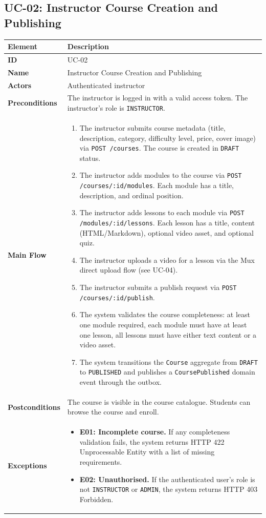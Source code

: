 \subsection{UC-02: Instructor Course Creation and Publishing}

\begin{longtable}{p{3cm}p{10cm}}
  \toprule
  \textbf{Element} & \textbf{Description} \\
  \midrule
  \endhead
  \midrule
  \endfoot
  \textbf{ID} & UC-02 \\
  \textbf{Name} & Instructor Course Creation and Publishing \\
  \textbf{Actors} & Authenticated instructor \\
  \textbf{Preconditions} & The instructor is logged in with a valid access token. The instructor's role is \texttt{INSTRUCTOR}. \\
  \textbf{Main Flow} &
  \begin{enumerate}
    \item The instructor submits course metadata (title, description, category, difficulty level, price, cover image) via \texttt{POST /courses}. The course is created in \texttt{DRAFT} status.
    \item The instructor adds modules to the course via \texttt{POST /courses/:id/modules}. Each module has a title, description, and ordinal position.
    \item The instructor adds lessons to each module via \texttt{POST /modules/:id/lessons}. Each lesson has a title, content (HTML/Markdown), optional video asset, and optional quiz.
    \item The instructor uploads a video for a lesson via the Mux direct upload flow (see UC-04).
    \item The instructor submits a publish request via \texttt{POST /courses/:id/publish}.
    \item The system validates the course completeness: at least one module required, each module must have at least one lesson, all lessons must have either text content or a video asset.
    \item The system transitions the \texttt{Course} aggregate from \texttt{DRAFT} to \texttt{PUBLISHED} and publishes a \texttt{CoursePublished} domain event through the outbox.
  \end{enumerate} \\
  \textbf{Postconditions} & The course is visible in the course catalogue. Students can browse the course and enroll. \\
  \textbf{Exceptions} &
  \begin{itemize}
    \item \textbf{E01: Incomplete course.} If any completeness validation fails, the system returns HTTP 422 Unprocessable Entity with a list of missing requirements.
    \item \textbf{E02: Unauthorised.} If the authenticated user's role is not \texttt{INSTRUCTOR} or \texttt{ADMIN}, the system returns HTTP 403 Forbidden.
  \end{itemize} \\
  \bottomrule
\end{longtable}

